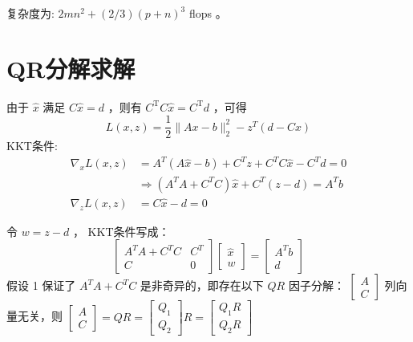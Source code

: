 复杂度为: $ 2 m n^{2}+(2 / 3)(p+n)^{3} $ flops 。

\section{QR分解求解}

由于 $ \hat{x} $ 满足 $ C \hat{x}=d $ ，则有 $ C^{\mathrm{T}} C \hat{x}=C^{\mathrm{T}} d $ ，可得
$$
L(x, z)=\frac{1}{2}\|A x-b\|_{2}^{2}-z^{T}(d-C x)
$$
KKT条件:
$$
\begin{aligned}
\nabla_{x} L(x, z) &=A^{T}(A \hat{x}-b)+C^{T} z+C^{T} C \hat{x}-C^{T} d=0 \\
& \Rightarrow\left(A^{T} A+C^{T} C\right) \hat{x}+C^{T}(z-d)=A^{T} b \\
\nabla_{z} L(x, z) &=C \hat{x}-d=0
\end{aligned}
$$

令 $ w=z-d $ ， KKT条件写成：
$$
\left[\begin{array}{cc}
A^{T} A+C^{T} C & C^{T} \\
C & 0
\end{array}\right]\left[\begin{array}{l}
\hat{x} \\
w
\end{array}\right]=\left[\begin{array}{c}
A^{T} b \\
d
\end{array}\right]
$$
假设 1 保证了 $ A^{T} A+C^{T} C $ 是非奇异的，即存在以下 $ Q R $ 因子分解：
$ \left[\begin{array}{l}A \\ C\end{array}\right] $ 列向量无关，则 $ \left[\begin{array}{l}A \\ C\end{array}\right]=Q R=\left[\begin{array}{l}Q_{1} \\ Q_{2}\end{array}\right] R=\left[\begin{array}{l}Q_{1} R \\ Q_{2} R\end{array}\right] $

